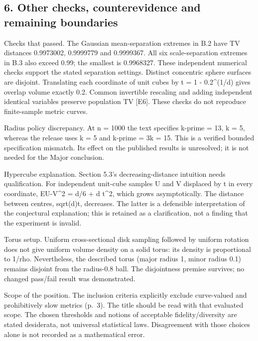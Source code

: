\documentclass[10pt]{article}
\begin{document}
\subsection*{6. Other checks, counterevidence and remaining boundaries}
Checks that passed. The Gaussian mean-separation extremes in B.2 have TV distances 0.9973002, 0.9999779 and 0.9999367. All six scale-separation extremes in B.3 also exceed 0.99; the smallest is 0.9968327. These independent numerical checks support the stated separation settings. Distinct concentric sphere surfaces are disjoint. Translating each coordinate of unit cubes by t = 1 - 0.2\textasciicircum{}(1/d) gives overlap volume exactly 0.2. Common invertible rescaling and adding independent identical variables preserve population TV [E6]. These checks do not reproduce finite-sample metric curves.\par
Radius policy discrepancy. At n = 1000 the text specifies k-prime = 13, k = 5, whereas the release uses k = 5 and k-prime = 3k = 15. This is a verified bounded specification mismatch. Its effect on the published results is unresolved; it is not needed for the Major conclusion.\par
Hypercube explanation. Section 5.3’s decreasing-distance intuition needs qualification. For independent unit-cube samples U and V displaced by t in every coordinate, EU-V\textasciicircum{}2 = d/6 + d t\textasciicircum{}2, which grows asymptotically. The distance between centres, sqrt(d)t, decreases. The latter is a defensible interpretation of the conjectural explanation; this is retained as a clarification, not a finding that the experiment is invalid.\par
Torus setup. Uniform cross-sectional disk sampling followed by uniform rotation does not give uniform volume density on a solid torus: its density is proportional to 1/rho. Nevertheless, the described torus (major radius 1, minor radius 0.1) remains disjoint from the radius-0.8 ball. The disjointness premise survives; no changed pass/fail result was demonstrated.\par
Scope of the position. The inclusion criteria explicitly exclude curve-valued and prohibitively slow metrics (p. 3). The title should be read with that evaluated scope. The chosen thresholds and notions of acceptable fidelity/diversity are stated desiderata, not universal statistical laws. Disagreement with those choices alone is not recorded as a mathematical error.\par
\end{document}

